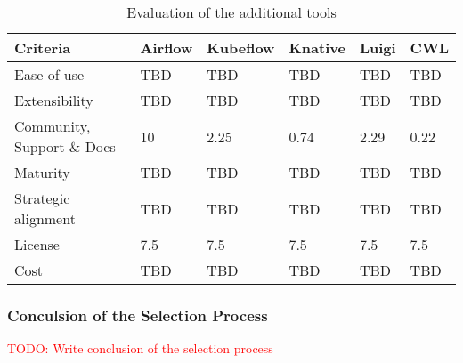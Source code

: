 \begin{table}[htb]
    \centering
    \begin{tabular}{|l|l|l|l|l|l|} \hline
        \textbf{Criteria}                                          & \textbf{Airflow}      & \textbf{Kubeflow}     & \textbf{Knative}      & \textbf{Luigi}        & \textbf{CWL}          \\ \hline
        Ease of use                                                & TBD                   & TBD                   & TBD                   & TBD                   & TBD                   \\ \hline
        Extensibility                                              & TBD                   & TBD                   & TBD                   & TBD                   & TBD                   \\ \hline
        Community, Support \& Docs                                 & 10                    & 2.25                  & 0.74                  & 2.29                  & 0.22                  \\ \hline
        Maturity                                                   & TBD                   & TBD                   & TBD                   & TBD                   & TBD                   \\ \hline
        Strategic alignment                                        & TBD                   & TBD                   & TBD                   & TBD                   & TBD                   \\ \hline
        License                                                    & 7.5                     & 7.5                     & 7.5                     & 7.5                     & 7.5                     \\ \hline
        Cost                                                       & TBD                   & TBD                   & TBD                   & TBD                   & TBD                   \\ \hline

    \end{tabular}
    \caption{Evaluation of the additional tools}
    \label{tab:evaluation_of_the_additional_tools}
\end{table}

\subsubsection{Conculsion of the Selection Process}

\textcolor{red}{TODO: Write conclusion of the selection process}

\blindtext[1]